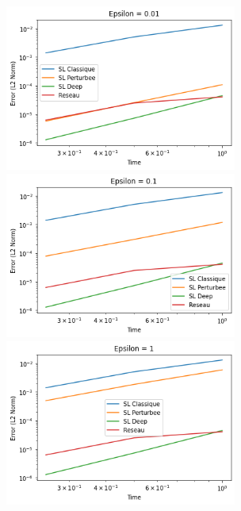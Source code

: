 \documentclass{article}
\begin{document}
\begin{figure}[!h]
    \centering
    \includegraphics[width=0.68\textwidth]{images/ep13.png}
    \includegraphics[width=0.68\textwidth]{images/ep14.png}
    \includegraphics[width=0.68\textwidth]{images/ep15.png}
\end{figure}
\newpage
\end{document}

